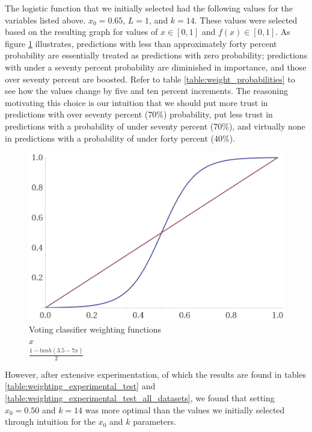 The logistic function that we initially selected had the following values for the variables listed above. $x_0=0.65$, $L=1$, and $k=14$. These values were selected based on the resulting graph for values of $x \in [0, 1]$ and $f(x) \in [0, 1]$. As figure \ref{graph:weights} illustrates, predictions with less than approximately forty percent probability are essentially treated as predictions with zero probability; predictions with under a seventy percent probability are diminished in importance, and those over seventy percent are boosted. Refer to table \ref{table:weight_probabilities} to see how the values change by five and ten percent increments. The reasoning motivating this choice is our intuition that we should put more trust in predictions with over seventy percent (70\%) probability, put less trust in predictions with a probability of under seventy percent  (70\%), and virtually none in predictions with a probability of under forty percent (40\%).

\begin{figure}
  \includegraphics[width=\linewidth]{./images/chapter3/weight_graph}
\caption{\label{graph:weights}Voting classifier weighting functions\\\protect\blueline$x$\\
\protect\redline $\frac{1-tanh(3.5-7x)}{2}$}
\end{figure}

However, after extensive experimentation, of which the results are found in tables \ref{table:weighting_experimental_test} and \ref{table:weighting_experimental_test_all_datasets}, we found that setting \textbf{$x_0=0.50$} and \textbf{$k=14$} was more optimal than the values we initially selected through intuition for the $x_0$ and $k$ parameters.

